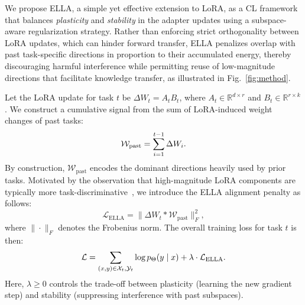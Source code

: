 \documentclass[11pt]{article}
\begin{document}
We propose ELLA, a simple yet effective extension to LoRA, as a CL framework that balances \textit{plasticity} and \textit{stability} in the adapter updates using a subspace-aware regularization strategy. Rather than enforcing strict orthogonality between LoRA updates, which can hinder forward transfer, ELLA penalizes overlap with past task-specific directions in proportion to their accumulated energy, thereby discouraging harmful interference while permitting reuse of low-magnitude directions 
that facilitate knowledge transfer, as illustrated in Fig.~\ref{fig:method}. 

Let the LoRA update for task $t$ be $\Delta W_t = A_t B_t$, where $A_t \in \mathbb{R}^{d \times r}$ and $B_t \in \mathbb{R}^{r \times k}$. We construct a cumulative signal from the sum of LoRA-induced weight changes of past tasks:
\vspace{-8pt}
\begin{equation}
\mathcal{W}_{\text{past}} = \sum_{i=1}^{t-1} \Delta W_i.
\vspace{-8pt}
\end{equation}
By construction, $\mathcal{W}_{\text{past}}$ encodes the dominant directions heavily used by prior tasks. 
Motivated by the observation that high-magnitude LoRA components are typically more task-discriminative~\cite{aghajanyan2020intrinsic}, 
we introduce the ELLA alignment penalty as follows:
\vspace{-6pt}
\begin{equation}
    \mathcal{L}_{\text{ELLA}} = \|\Delta W_t * \mathcal{W}_{\text{past}}\|_F^2,
\end{equation}
where $\|\cdot\|_F$ denotes the Frobenius norm. The overall training loss for task $t$ is then:
\vspace{-5pt}
\begin{equation}
    \mathcal{L} = \sum_{(x, y) \in \mathcal{X}_t, \mathcal{Y}_t} \log p_\Theta(y \mid x) + \lambda \cdot \mathcal{L}_{\text{ELLA}}.
\vspace{-5pt}
\label{eq:totalloss}
\end{equation}
Here, $\lambda \geq 0$ controls the trade-off between plasticity (learning the new gradient step) and stability (suppressing interference with past subspaces). 
\end{document}
